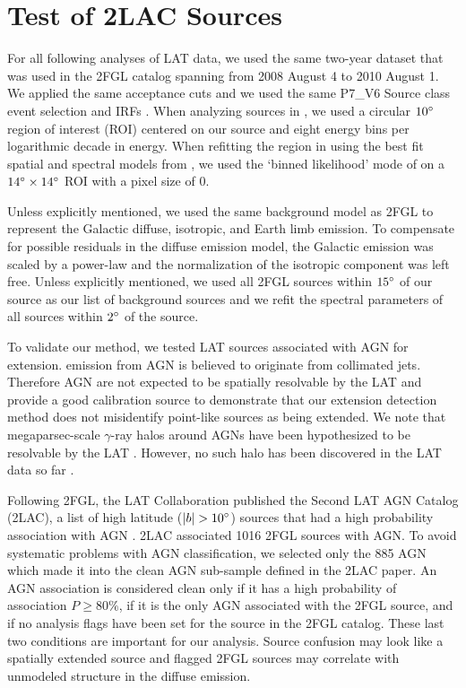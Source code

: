 \section{Test of 2LAC Sources}

For all following analyses of LAT data, we used the same two-year dataset
that was used in the 2FGL catalog spanning from 2008 August 4 to 2010
August 1. We applied the same acceptance cuts and we used the same P7\_V6
Source class event selection and IRFs \citep{ackermann_2012a_fermi-large}.
When analyzing sources in \pointlike, we used a circular $10^\circ$
region of interest (ROI) centered on our source and eight energy bins
per logarithmic decade in energy.  When refitting the region in \gtlike
using the best fit spatial and spectral models from \pointlike, we used
the `binned likelihood' mode of \gtlike on a $14^\circ\times14^\circ$
ROI with a pixel size of 0.

Unless explicitly mentioned, we used the same background model as 2FGL
to represent the Galactic diffuse, isotropic, and Earth limb emission.
To compensate for possible residuals in the diffuse emission model,
the Galactic emission was scaled by a power-law and the normalization
of the isotropic component was left free.  Unless explicitly mentioned,
we used all 2FGL sources within $15^\circ$ of our source as our list of
background sources and we refit the spectral parameters of all sources
within $2^\circ$ of the source.

To validate our method, we tested LAT sources associated with AGN
for extension.  \gev emission from AGN is believed to originate from
collimated jets.  Therefore AGN are not expected to be spatially
resolvable by the LAT and provide a good calibration source to
demonstrate that our extension detection method does not misidentify
point-like sources as being extended.  We note that megaparsec-scale
$\gamma$-ray halos around AGNs have been hypothesized to be
resolvable by the LAT \citep{aharonian_1994a_energy-gamma}. However,
no such halo has been discovered in the LAT data so far
\citep{neronov_2011a_evidence-gamma-ray}.

Following 2FGL, the LAT Collaboration published the Second LAT AGN Catalog
(2LAC), a list of high latitude ($|b|>10\degree$) sources that had a high
probability association with AGN \citep{ackermann_2011a_second-catalog}.
2LAC associated 1016 2FGL sources with AGN.  To avoid systematic problems
with AGN classification, we selected only the 885 AGN which made it into
the clean AGN sub-sample defined in the 2LAC paper.  An AGN association is
considered clean only if it has a high probability of association $P\ge
80\%$, if it is the only AGN associated with the 2FGL source, and if no
analysis flags have been set for the source in the 2FGL catalog. These
last two conditions are important for our analysis. Source confusion
may look like a spatially extended source and flagged 2FGL sources may
correlate with unmodeled structure in the diffuse emission.

